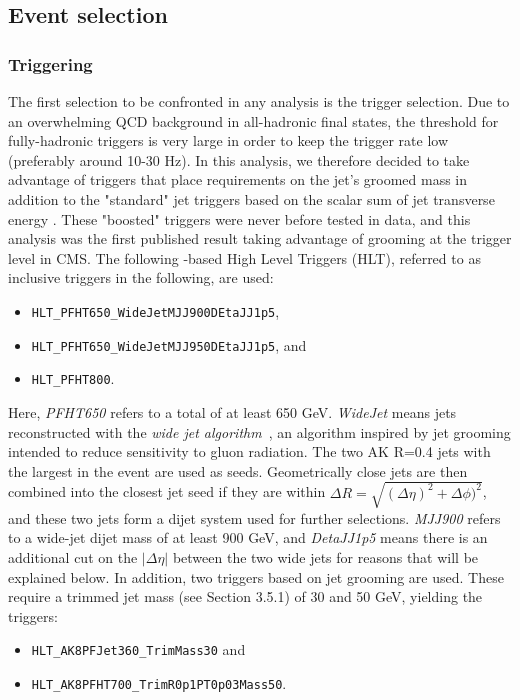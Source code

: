 \subsection{Event selection}

\subsubsection{Triggering}
\label{sec:searchI:trigger}
The first selection to be confronted in any analysis is the trigger selection. Due to an overwhelming QCD background in all-hadronic final states, the threshold for fully-hadronic triggers is very large in order to keep the trigger rate low (preferably around 10-30 Hz). In this analysis, we therefore decided to take advantage of triggers that place requirements on the jet's groomed mass in addition to the "standard" jet triggers based on the scalar sum of jet transverse energy \HT. These "boosted" triggers were never before tested in data, and this analysis was the first published result taking advantage of grooming at the trigger level in CMS. The following \HT-based High Level Triggers (HLT), referred to as inclusive triggers in the following, are used:
\begin{itemize}
\item \texttt{HLT\_PFHT650\_WideJetMJJ900DEtaJJ1p5},
\item \texttt{HLT\_PFHT650\_WideJetMJJ950DEtaJJ1p5}, and
\item \texttt{HLT\_PFHT800}.
\end{itemize}
Here, \emph{PFHT650} refers to a total \HT of at least 650 GeV. \emph{WideJet} means jets reconstructed with the \emph{wide jet algorithm}~\cite{2011123}, an algorithm inspired by jet grooming intended to reduce sensitivity to gluon radiation. The two AK R=0.4 jets with the largest \PT in the event are used as seeds. Geometrically close jets are then combined into the closest jet seed if they are within $\Delta R = \sqrt{(\Delta \eta)^2+\Delta \phi)^2}$, and these two jets form a dijet system used for further selections. \emph{MJJ900} refers to a wide-jet dijet mass of at least 900 GeV, and \emph{DetaJJ1p5} means there is an additional cut on the $|\Delta \eta|$ between the two wide jets for reasons that will be explained below. In addition, two triggers based on jet grooming are used. These require a trimmed jet mass (see Section 3.5.1) of 30 and 50 GeV, yielding the triggers:
\begin{itemize}
\item \texttt{HLT\_AK8PFJet360\_TrimMass30} and
\item \texttt{HLT\_AK8PFHT700\_TrimR0p1PT0p03Mass50}.
\end{itemize}

